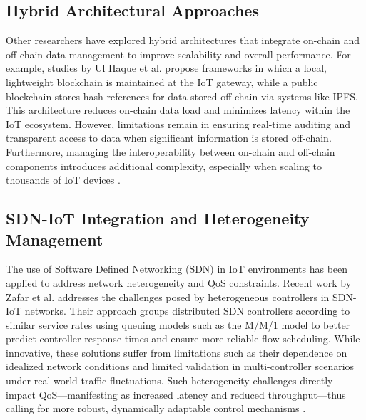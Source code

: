 \documentclass[12pt,onecolumn]{IEEEtran} %
\begin{document}
\subsection*{Hybrid Architectural Approaches}
Other researchers have explored hybrid architectures that integrate on-chain and off-chain data management to improve scalability and overall performance. For example, studies by Ul Haque et al. \cite{haque2024ascalableblockchain} propose frameworks in which a local, lightweight blockchain is maintained at the IoT gateway, while a public blockchain stores hash references for data stored off-chain via systems like IPFS. This architecture reduces on-chain data load and minimizes latency within the IoT ecosystem. However, limitations remain in ensuring real-time auditing and transparent access to data when significant information is stored off-chain. Furthermore, managing the interoperability between on-chain and off-chain components introduces additional complexity, especially when scaling to thousands of IoT devices \cite{haque2024ascalableblockchain}.

\subsection*{SDN-IoT Integration and Heterogeneity Management}
The use of Software Defined Networking (SDN) in IoT environments has been applied to address network heterogeneity and QoS constraints. Recent work by Zafar et al. \cite{zafar2023anadvancedstrategy} addresses the challenges posed by heterogeneous controllers in SDN-IoT networks. Their approach groups distributed SDN controllers according to similar service rates using queuing models such as the M/M/1 model to better predict controller response times and ensure more reliable flow scheduling. While innovative, these solutions suffer from limitations such as their dependence on idealized network conditions and limited validation in multi-controller scenarios under real-world traffic fluctuations. Such heterogeneity challenges directly impact QoS---manifesting as increased latency and reduced throughput---thus calling for more robust, dynamically adaptable control mechanisms \cite{zafar2023anadvancedstrategy}.
\end{document}
